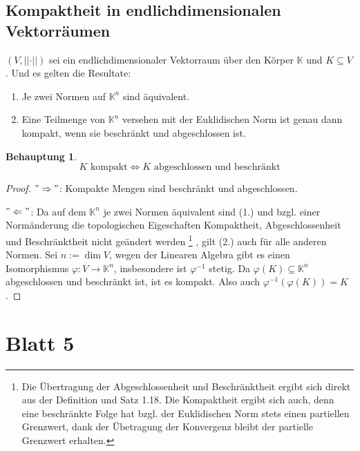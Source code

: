 \documentclass[ngerman]{article}
\theoremstyle{definition}%
\newtheorem*{beh}{Behauptung}
\newcommand{\K}{\mathbb{K}}
\newcommand{\norm}[1]{\left\lvert \left\lvert #1 \right\rvert \right\rvert}
\newcommand{\df}{\Rightarrow} %
\newcommand{\afs}{"{}}
\renewcommand{\{ }{\left\lbrace}
\renewcommand{\}}{\right\rbrace}
\begin{document}
\subsection{Kompaktheit in endlichdimensionalen Vektorräumen}
$(V,\norm{\cdot})$ sei ein endlichdimensionaler Vektorraum über den Körper $\K$ und $K\subseteq V$.
Und es gelten die Resultate:
	\begin{enumerate}[(1.)]
	\item Je zwei Normen auf $\K^n$ sind äquivalent.
	
	\item Eine Teilmenge von $\K^n$ versehen mit der Euklidischen Norm ist genau dann kompakt, wenn sie beschränkt und abgeschlossen ist.	
	\end{enumerate}
\begin{beh}
	$$K \text{ kompakt} \Leftrightarrow K \text{ abgeschlossen und beschränkt}$$
\end{beh}
\begin{proof}
	$\afs\df\afs$: Kompakte Mengen sind beschränkt und abgeschlossen.\par
	$\afs \Leftarrow \afs$: 
	Da auf dem $\K^n$ je zwei Normen äquivalent sind (1.) und bzgl. einer Normänderung die topologischen Eigeschaften Kompaktheit, Abgeschlossenheit und Beschränktheit nicht geändert werden
	\footnote{Die Übertragung der Abgeschlossenheit und Beschränktheit ergibt sich direkt aus der Definition und Satz 1.18. Die Kompaktheit ergibt sich auch, denn eine beschränkte Folge hat bzgl. der Euklidischen Norm stets einen partiellen Grenzwert, dank der Übetragung der Konvergenz bleibt der partielle Grenzwert erhalten.}	
	, gilt (2.) auch für alle anderen Normen. Sei $n:= \dim V$, wegen der Linearen Algebra gibt es einen Isomorphismus $\varphi:V\to \K^n$, insbesondere ist $\varphi^{-1}$ stetig. Da $\varphi(K)\subseteq \K^n$ abgeschlossen und beschränkt ist, ist es kompakt. Also auch $\varphi^{-1}(\varphi(K))=K$.	
\end{proof}

\newpage
\section{Blatt 5}
\end{document}
